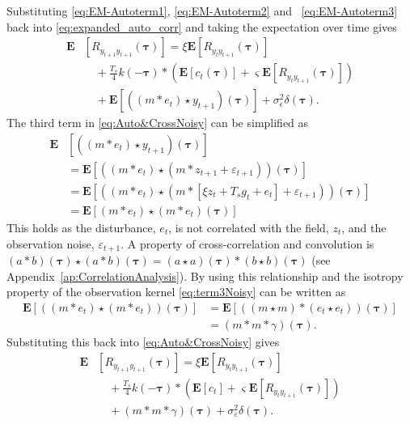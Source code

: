 \documentclass[10pt,twocolumn,twoside]{IEEEtran}
\begin{document}
Substituting \eqref{eq:EM-Autoterm1}, \eqref{eq:EM-Autoterm2} and ~\eqref{eq:EM-Autoterm3} back into \eqref{eq:expanded_auto_corr} and taking the expectation over time  gives
\begin{align}\label{eq:Auto&CrossNoisy}
	\mathbf{E}&[R_{y_{t+1}y_{t+1}}(\boldsymbol{\tau})] = \xi \mathbf{E}[R_{y_ty_{t+1}}(\boldsymbol{\tau})] \nonumber \\
	&\quad+  \frac{T_s}{4} k(-\boldsymbol\tau) \ast (\mathbf{E}\left[c_t(\boldsymbol\tau)\right] + \varsigma \mathbf{E}\left[R_{y_ty_{t+1}}(\boldsymbol\tau)\right] ) \nonumber \\
	&\quad+\mathbf{E}[((m\ast e_t)\star y_{t+1})(\boldsymbol\tau)]+\sigma_{\epsilon}^2\delta(\boldsymbol{\tau}).
\end{align}
The third term in \eqref{eq:Auto&CrossNoisy} can be simplified as 
\begin{align}\label{eq:term3Noisy}
\mathbf{E}&[((m\ast e_t)\star y_{t+1})(\boldsymbol\tau)] \nonumber \\
  &=\mathbf{E}[((m\ast e_t)\star (m\ast z_{t+1}+\varepsilon_{t+1})) (\boldsymbol\tau)] \nonumber \\
	&= \mathbf{E}[(\left(m \ast e_t\right) \star (m \ast [\xi z_t+ T_s g_t + e_t]+\varepsilon_{t+1}))(\boldsymbol\tau)] \nonumber \\
	&=\mathbf{E}[\left(m \ast e_t\right)\star\left(m \ast e_t\right)(\boldsymbol\tau)]
\end{align} 
This holds as the disturbance, $e_t$, is not correlated with the field, $z_t$, and the observation noise, $\varepsilon_{t+1}$. A property of cross-correlation and convolution is $(a \ast b)(\boldsymbol\tau) \star (a \ast b)(\boldsymbol\tau)=(a \star a)(\boldsymbol\tau)\ast(b \star b)(\boldsymbol\tau)$ (see Appendix~\ref{ap:CorrelationAnalysis}). By using this relationship and the isotropy property of the observation kernel \eqref{eq:term3Noisy} can be written as
\begin{align}\label{eq:EM-Autoterm4}
\mathbf{E}[(\left(m \ast e_t\right)\star\left(m \ast e_t\right))(\boldsymbol\tau)]&=\mathbf{E}[(\left(m \star m\right)\ast\left(e_t \star e_t\right))(\boldsymbol\tau)] \nonumber \\
&=(m\ast m \ast \gamma)(\boldsymbol\tau).
\end{align}
Substituting this back into \eqref{eq:Auto&CrossNoisy}  gives
\begin{align}
	\mathbf{E}&[R_{y_{t+1}y_{t+1}}(\boldsymbol{\tau})] = \xi \mathbf{E}[R_{y_ty_{t+1}}(\boldsymbol{\tau})] \nonumber \\
	&\quad+  \frac{T_s}{4} k(-\boldsymbol\tau) \ast (\mathbf{E}\left[c_t\right] + \varsigma \mathbf{E}\left[R_{y_ty_{t+1}}(\boldsymbol\tau)\right] ) \nonumber \\
	&\quad+(m\ast m \ast \gamma)(\boldsymbol\tau)+\sigma_{\varepsilon}^2\delta(\boldsymbol{\tau}).
\end{align}
\end{document}
